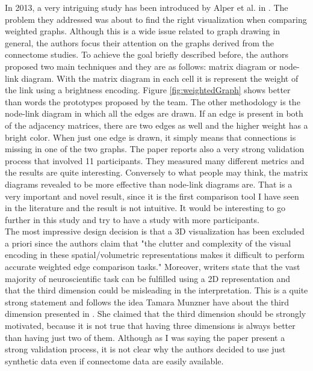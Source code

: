 \documentclass{article}
\begin{document}
\begin{multicols}{2}
In 2013, a very intriguing study has been introduced by Alper et al. in \cite{weightedGraphComparison}. The problem they addressed was about to find the right visualization when comparing weighted graphs. Although this is a wide issue related to graph drawing in general, the authors focus their attention on the graphs derived from the connectome studies. To achieve the goal briefly described before, the authors proposed two main techniques and they are as follows: matrix diagram or node-link diagram. With the matrix diagram in each cell it is represent the weight of the link using a brightness encoding. Figure \ref{fig:weightedGraph} shows better than words the prototypes proposed by the team. The other methodology is the node-link diagram in which all the edges are drawn. If an edge is present in both of the adjacency matrices, there are two edges as well and the higher weight has a bright color. When just one edge is drawn, it simply means that connections is missing in one of the two graphs.
The paper reports also a very strong validation process that involved 11 participants. They measured many different metrics and the results are quite interesting. Conversely to what people may think, the matrix diagrams revealed to be more effective than node-link diagrams are. That is a very important and novel result, since it is the first comparison tool I have seen in the literature and the result is not intuitive. It would be interesting to go further in this study and try to have a study with more participants.\\
The most impressive design decision is that a 3D visualization has been excluded a priori since the authors claim that "the clutter and complexity of the visual encoding in these spatial/volumetric representations makes it difficult to perform accurate weighted edge comparison tasks." Moreover, writers state that the vast majority of neuroscientific task can be fulfilled using a 2D representation and that the third dimension could be misleading in the interpretation. This is a quite strong statement and follows the idea Tamara Munzner have about the third dimension presented in \cite{processAndPitfalls}. She claimed that the third dimension should be strongly motivated, because it is not true that having three dimensions is always better than having just two of them. Although as I was saying the paper present a  strong validation process, it is not clear why the authors decided to use just synthetic data even if connectome data are easily available.


\end{multicols}
\end{document}
